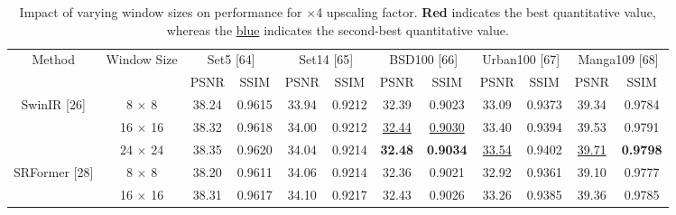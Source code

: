 \documentclass[twocolumn]{svjour3}          %
\begin{document}
\begin{table}
\centering
\caption{Impact of varying window sizes on performance for $\times$4 upscaling factor. {\color{red}\textbf{Red}} indicates the best quantitative value, whereas the {\color{blue}\underline{blue}} indicates the second-best quantitative value.}
\label{table3}
\setlength{\tabcolsep}{3pt}

\begin{tabular}{|c|c|cc|cc|cc|cc|cc|}
  \hline
  \multirow{2}{*}{Method} & \multirow{2}{*}{Window Size} & \multicolumn{2}{c|}{Set5 [64]} & \multicolumn{2}{c|}{Set14 [65]} & \multicolumn{2}{c|}{BSD100 [66]} & \multicolumn{2}{c|}{Urban100 [67]} & \multicolumn{2}{c|}{Manga109 [68]}   \\
  
\cline{3-12} && \multicolumn{1}{c|}{PSNR}  & SSIM & \multicolumn{1}{c|}{PSNR}  & SSIM  & \multicolumn{1}{c|}{PSNR}  & SSIM  & \multicolumn{1}{c|}{PSNR}  & SSIM & \multicolumn{1}{c|}{PSNR}  & SSIM \\
 \hline
  \multirow{3}{*}{SwinIR [26]} & {8 $\times$ 8}  & \multicolumn{1}{c|}{38.24} &{0.9615}  & \multicolumn{1}{c|}{33.94} &{0.9212} & \multicolumn{1}{c|}{32.39} &{0.9023} & \multicolumn{1}{c|}{33.09} &{0.9373}  & \multicolumn{1}{c|}{39.34} &{0.9784} \\
            & {16 $\times$ 16}   & \multicolumn{1}{c|}{38.32} &{0.9618}  & \multicolumn{1}{c|}{34.00} &{0.9212} & \multicolumn{1}{c|}{\color{blue}\underline{32.44}} &{\color{blue}\underline{0.9030}} & \multicolumn{1}{c|}{33.40} &{0.9394}  & \multicolumn{1}{c|}{39.53} &{0.9791} \\
            & {24 $\times$ 24} & \multicolumn{1}{c|}{38.35} &{0.9620}  & \multicolumn{1}{c|}{34.04} &{0.9214} & \multicolumn{1}{c|}{\color{red}\textbf{32.48}} &{\color{red}\textbf{0.9034}} & \multicolumn{1}{c|}{\color{blue}\underline{33.54}} &{0.9402}  & \multicolumn{1}{c|}{\color{blue}\underline{39.71}} &{\color{red}\textbf{0.9798}}  \\
  \hline
  \multirow{3}{*}{SRFormer [28]} & {8 $\times$ 8}  & \multicolumn{1}{c|}{38.20} &{0.9611}  & \multicolumn{1}{c|}{34.06} &{0.9214} & \multicolumn{1}{c|}{32.36} &{0.9021} & \multicolumn{1}{c|}{32.92} &{0.9361}  & \multicolumn{1}{c|}{39.10} &{0.9777} \\
            & {16 $\times$ 16}   & \multicolumn{1}{c|}{38.31} &{0.9617}  & \multicolumn{1}{c|}{34.10} &{0.9217} & \multicolumn{1}{c|}{32.43} &{0.9026} & \multicolumn{1}{c|}{33.26} &{0.9385}  & \multicolumn{1}{c|}{39.36} &{0.9785} \\

\end{tabular}
\end{table}
\end{document}
